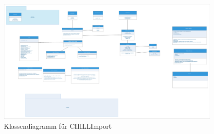 \begin{figure}[htbp]
\centering
\includegraphics[scale=0.15]{Klassendiagramm/klassendiagramm.eps}
\caption{Klassendiagramm für CHILLImport}
\end{figure}
